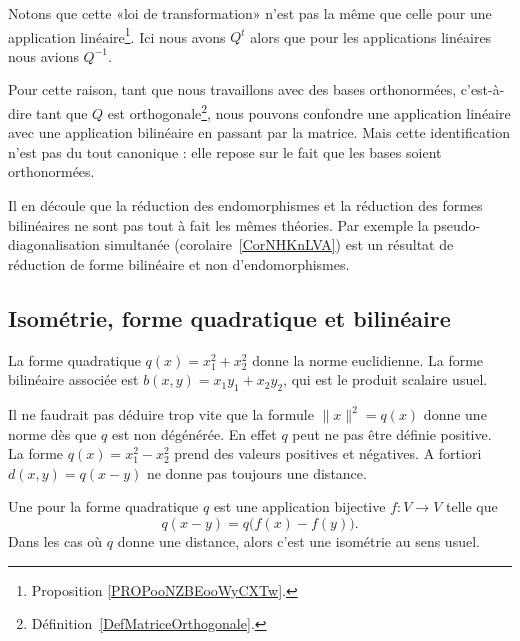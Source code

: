 \begin{remark}      \label{REMooNEJLooSqgeih}
	Notons que cette «loi de transformation» n'est pas la même que celle pour une application linéaire\footnote{Proposition \ref{PROPooNZBEooWyCXTw}.}. Ici nous avons \( Q^t\) alors que pour les applications linéaires nous avions \( Q^{-1}\).

	Pour cette raison, tant que nous travaillons avec des bases orthonormées, c'est-à-dire tant que \( Q\) est orthogonale\footnote{Définition~\ref{DefMatriceOrthogonale}.}, nous pouvons confondre une application linéaire avec une application bilinéaire en passant par la matrice. Mais cette identification n'est pas du tout canonique : elle repose sur le fait que les bases soient orthonormées.

	Il en découle que la réduction des endomorphismes et la réduction des formes bilinéaires ne sont pas tout à fait les mêmes théories. Par exemple la pseudo-diagonalisation simultanée (corolaire~\ref{CorNHKnLVA}) est un résultat de réduction de forme bilinéaire et non d'endomorphismes.
\end{remark}

\subsection{Isométrie, forme quadratique et bilinéaire}

\begin{example}
	La forme quadratique \( q(x)=x_1^2+x_2^2\) donne la norme euclidienne. La forme bilinéaire associée est \( b(x,y)=x_1y_1+x_2y_2\), qui est le produit scalaire usuel.
\end{example}

Il ne faudrait pas déduire trop vite que la formule \( \| x \|^2=q(x)\) donne une norme dès que \( q\) est non dégénérée. En effet \( q\) peut ne pas être définie positive. La forme \( q(x)=x_1^2-x_2^2\) prend des valeurs positives et négatives. A fortiori \( d(x,y)=q(x-y)\) ne donne pas toujours une distance.

\begin{definition}      \label{DEFooECTUooRxBhHf}
	Une  pour la forme quadratique \( q\) est une application bijective \( f\colon V\to V\) telle que
	\begin{equation}
		q(x-y)=q\big( f(x)-f(y) \big).
	\end{equation}
	Dans les cas où \( q\) donne une distance, alors c'est une isométrie au sens usuel.
\end{definition}

